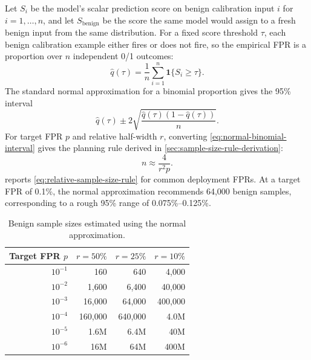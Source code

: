 \documentclass{article}
\begin{document}
Let $S_i$ be the model's scalar prediction score on benign calibration input $i$ for $i=1,\ldots,n$, and let $S_{\mathrm{benign}}$ be the score the same model would assign to a fresh benign input from the same distribution.
For a fixed score threshold $\tau$, each benign calibration example either fires or does not fire, so the empirical FPR is a proportion over $n$ independent 0/1 outcomes:
\begin{equation}
\label{eq:fixed-threshold-binomial}
\widehat q(\tau)=\frac{1}{n}\sum_{i=1}^{n}\mathbf{1}\{S_i\ge \tau\}.
\end{equation}
The standard normal approximation for a binomial proportion gives the 95\% interval \citep{nistBinomialConfidence}
\begin{equation}
\label{eq:normal-binomial-interval}
\widehat q(\tau)
\pm
2\sqrt{\frac{\widehat q(\tau)(1-\widehat q(\tau))}{n}}.
\end{equation}
For target FPR $p$ and relative half-width $r$, converting \cref{eq:normal-binomial-interval} gives the planning rule derived in \cref{sec:sample-size-rule-derivation}:
\begin{equation}
\label{eq:relative-sample-size-rule}
n \approx \frac{4}{r^2p}.
\end{equation}
 reports \cref{eq:relative-sample-size-rule} for common deployment FPRs.
At a target FPR of 0.1\%, the normal approximation recommends 64{,}000 benign samples, corresponding to a rough 95\% range of 0.075\%--0.125\%.

\begin{table}[!htb]
  \centering
  \caption{%
    Benign sample sizes estimated using the normal approximation.
  }
  \label{tab:sample-sizes}
  \begin{tabular}{rrrr}
    \toprule
    Target FPR $p$ & $r = 50\%$ & $r = 25\%$ & $r = 10\%$ \\
    \midrule
    $10^{-1}$ & 160       & 640       & 4{,}000 \\
    $10^{-2}$ & 1{,}600   & 6{,}400   & 40{,}000 \\
    $10^{-3}$ & 16{,}000  & 64{,}000  & 400{,}000 \\
    $10^{-4}$ & 160{,}000 & 640{,}000 & 4.0M \\
    $10^{-5}$ & 1.6M      & 6.4M      & 40M \\
    $10^{-6}$ & 16M       & 64M       & 400M \\
    \bottomrule
  \end{tabular}
\end{table}
\end{document}
